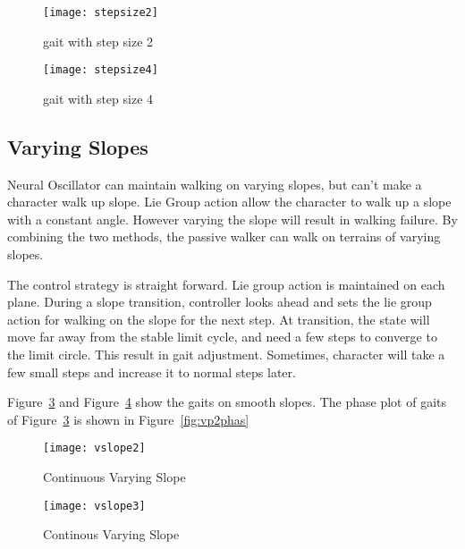 \begin{figure}[!htbp]
  \begin{center}
      \texttt{[image: stepsize2]}
    \caption{gait with step size 2}
    \label{fig:ssp2}
\end{center}
\end{figure}

\begin{figure}[!htbp]
  \begin{center}
      \texttt{[image: stepsize4]}
    \caption{gait with step size 4}
    \label{fig:ssp3}
\end{center}
\end{figure}







\subsection{Varying Slopes}
Neural Oscillator can maintain walking on varying slopes, but can't make a character walk up slope.
Lie Group action allow the character to walk up a slope with a constant angle.
However varying the slope will result in walking failure.
By combining the two methods, the passive walker can walk on terrains of varying slopes.


The control strategy is straight forward.
Lie group action is maintained on each plane.
During a slope transition, controller looks ahead and sets the lie group action for  walking on the slope for the next step.
At transition, the state will move far away from the stable limit cycle, and need a few steps to converge to the limit circle.
This result in gait adjustment.
Sometimes, character will take a few small steps and increase it to normal steps later.


Figure~\ref{fig:vp1} and Figure~\ref{fig:vp2} show the gaits on smooth slopes.
The phase plot of gaits of Figure~\ref{fig:vp1} is shown in Figure~\ref{fig:vp2phas} 

\begin{figure}[!htbp]
  \begin{center}
      \texttt{[image: vslope2]}
    \caption{Continuous Varying Slope}
    \label{fig:vp1}
\end{center}
\end{figure}


\begin{figure}[!htbp]
  \begin{center}
      \texttt{[image: vslope3]}
    \caption{Continous Varying Slope}
    \label{fig:vp2}
\end{center}
\end{figure}


